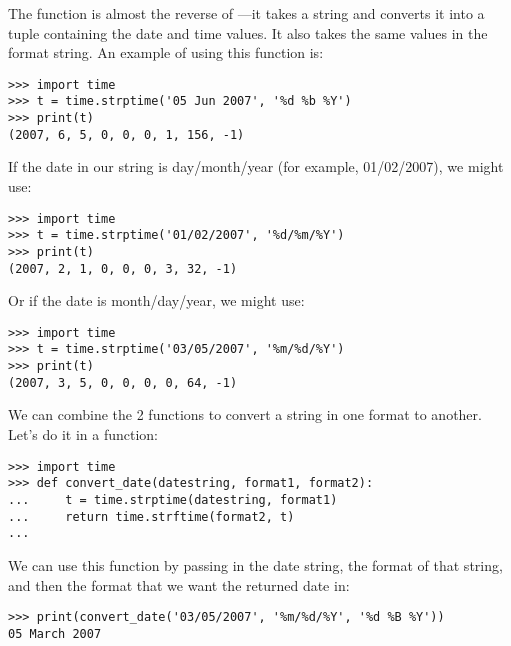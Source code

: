 The function  is almost the reverse of ---it takes a string and converts it into a tuple containing the date and time values. It also takes the same values in the format string. An example of using this function is:

\begin{Verbatim}[frame=single]
>>> import time
>>> t = time.strptime('05 Jun 2007', '%d %b %Y')
>>> print(t)
(2007, 6, 5, 0, 0, 0, 1, 156, -1)
\end{Verbatim}

\noindent
If the date in our string is day/month/year (for example, 01/02/2007), we might use:

\begin{Verbatim}[frame=single]
>>> import time
>>> t = time.strptime('01/02/2007', '%d/%m/%Y')
>>> print(t)
(2007, 2, 1, 0, 0, 0, 3, 32, -1)
\end{Verbatim}

\noindent
Or if the date is month/day/year, we might use:

\begin{Verbatim}[frame=single]
>>> import time
>>> t = time.strptime('03/05/2007', '%m/%d/%Y')
>>> print(t)
(2007, 3, 5, 0, 0, 0, 0, 64, -1)
\end{Verbatim}

\noindent
We can combine the 2 functions to convert a string in one format to another. Let's do it in a function:

\begin{Verbatim}[frame=single]
>>> import time
>>> def convert_date(datestring, format1, format2):
...     t = time.strptime(datestring, format1)
...     return time.strftime(format2, t)
...
\end{Verbatim}

\noindent
We can use this function by passing in the date string, the format of that string, and then the format that we want the returned date in:

\begin{Verbatim}[frame=single]
>>> print(convert_date('03/05/2007', '%m/%d/%Y', '%d %B %Y'))
05 March 2007
\end{Verbatim}

\newpage
